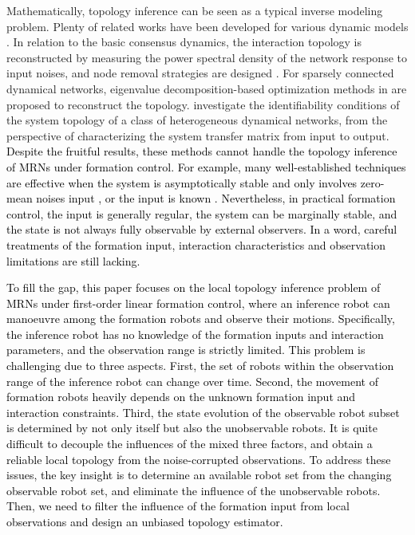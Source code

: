 \documentclass[12pt,journal,draftclsnofoot,onecolumn]{IEEEtran}
\begin{document}
Mathematically, topology inference can be seen as a typical inverse modeling problem. 
Plenty of related works have been developed for various dynamic models \cite{deka2016learning,shi2019bayesian,lu2019nonparametric,dong2019learning}. 
In relation to the basic consensus dynamics, the interaction topology is reconstructed by measuring the power spectral density of the network response to input noises, and node removal strategies are designed \cite{shahrampour2013reconstruction,shahrampour2014topology}. 
For sparsely connected dynamical networks, eigenvalue decomposition-based optimization methods in \cite{hassan2016topology,mateos2019connecting} are proposed to reconstruct the topology. 
\cite{bazanella2019network,van2021topology} investigate the identifiability conditions of the system topology of a class of heterogeneous dynamical networks, from the perspective of characterizing the system transfer matrix from input to output.
\textcolor{black}{
Despite the fruitful results, these methods cannot handle the topology inference of MRNs under formation control. 
For example, many well-established techniques are effective when the system is asymptotically stable and only involves zero-mean noises input \cite{matta2018consistent}, or the input is known \cite{coutino2020state,8985069}. 
Nevertheless, in practical formation control, the input is generally regular, the system can be marginally stable, and the state is not always fully observable by external observers. 
In a word, careful treatments of the formation input, interaction characteristics and observation limitations are still lacking. }



\textcolor{black}{
To fill the gap, this paper focuses on the local topology inference problem of MRNs under first-order linear formation control, 
where an inference robot can manoeuvre among the formation robots and observe their motions. 
Specifically, the inference robot has no knowledge of the formation inputs and interaction parameters, and the observation range is strictly limited. 
This problem is challenging due to three aspects. 
First, the set of robots within the observation range of the inference robot can change over time. 
Second, the movement of formation robots heavily depends on the unknown formation input and interaction constraints. 
Third, the state evolution of the observable robot subset is determined by not only itself but also the unobservable robots. 
It is quite difficult to decouple the influences of the mixed three factors, and obtain a reliable local topology from the noise-corrupted observations. 
To address these issues, the key insight is to determine an available robot set from the changing observable robot set, and eliminate the influence of the unobservable robots. 
Then, we need to filter the influence of the formation input from local observations and design an unbiased topology estimator. }
\end{document}
